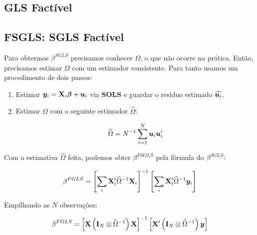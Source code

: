\documentclass[11pt, oneside, a4paper, article]{article}
\numberwithin{equation}{section}
\begin{document}
\begin{description}
	\clearpage
	\section{GLS Factível}

	\noindent
	\citet[Sec.7.5 -- Feasible GLS, p.153]{wool-2010} 

	\subsection{FSGLS: SGLS Factível}

	Para obtermos $\beta^{SGLS}$ precisamos conhecer $\Omega$, o que não ocorre na prática.
	Então, precisamos estimar $\Omega$ com um estimador consistente.
	Para tanto usamos um procedimento de dois passos:

	\begin{enumerate}
		\item  %
			Estimar $\boldsymbol{y}_{i} = \mathbf{X}_{i} \boldsymbol{\beta} + \boldsymbol{u}_{i}$ via \textbf{SOLS} e guardar o resíduo estimado $\widehat{\boldsymbol{u}_{i}}$.

		\item  %
			Estimar $\Omega$ com o seguinte estimador $\widehat{\Omega}$:

			\vspace{-1.5 em}
			\begin{align*}
				\widehat{\Omega} 
				= 
				N^{-1} \sum_{i=1}^{N} \boldsymbol{u}_{i} \boldsymbol{u}_{i}'
			\end{align*}
	\end{enumerate}

	Com a estimativa $\widehat{\Omega}$ feita, podemos obter $\beta^{FSGLS}$ pela fórmula do $\beta^{SGLS}$:

	\vspace{-1.5 em}
	\begin{align*}
		\beta^{FGLS}
		= 
		\left[ 
			\sum_{i} \mathbf{X}_{i}' \widehat{\Omega}^{-1} \mathbf{X}_{i}
		\right]^{-1}
		\left[ 
			\sum_{i} \mathbf{X}_{i}' \widehat{\Omega}^{-1} \boldsymbol{y}_{i}
		\right]
	\end{align*}

	Empilhando as $N$ observações:

	\vspace{-1.5 em}
	\begin{align*}
		\beta^{FGLS}
		= 
		\left[ \mathbf{X} \left( \mathbf{I}_{N} \otimes \widehat{\Omega}^{-1} \right) \mathbf{X} \right]^{-1}
		\left[ \mathbf{X}' \left( \mathbf{I}_{N} \otimes \widehat{\Omega}^{-1} \right) \boldsymbol{y} \right]
	\end{align*}


\end{description}
\end{document}
